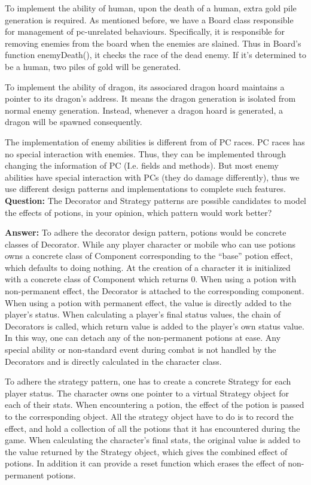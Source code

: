 \documentclass[11pt]{article}
\theoremstyle{plain} \newtheorem{theorem*}{Theorem}[subsection]
\begin{document}
To implement the ability of human, upon the death of a human, extra gold pile
generation is required. As mentioned before, we have a Board class responsible
for management of pc-unrelated behaviours. Specifically, it is responsible for
removing enemies from the board when the enemies are slained. Thus in Board’s
function enemyDeath(), it checks the race of the dead enemy. If it’s determined
to be a human, two piles of gold will be generated. 

To implement the ability of dragon, its associared dragon hoard maintains a
pointer to its dragon’s address. It means the dragon generation is isolated
from normal enemy generation. Instead, whenever a dragon hoard is generated, a
dragon will be spawned consequently.  

The implementation of enemy abilities is different from of PC races. PC races
has no special interaction with enemies. Thus, they can be implemented through
changing the information of PC (I.e. fields and methods). But most enemy
abilities have special interaction with PCs (they do damage differently), thus
we use different design patterns and implementations to complete such features. \\

\textbf{Question:}
The Decorator and Strategy patterns are possible candidates to model the
effects of potions, in your opinion, which pattern would work better? 

\textbf{Answer:}
To adhere the decorator design pattern, potions would be concrete classes of
Decorator. While any player character or mobile who can use potions owns a
concrete class of Component corresponding to the “base” potion effect, which
defaults to doing nothing. At the creation of a character it is initialized
with a concrete class of Component which returns 0. When using a potion with
non-permanent effect, the Decorator is attached to the corresponding component.
When using a potion with permanent effect, the value is directly added to the
player’s status. When calculating a player’s final status values, the chain of
Decorators is called, which return value is added to the player’s own status
value. In this way, one can detach any of the non-permanent potions at ease.
Any special ability or non-standard event during combat is not handled by the
Decorators and is directly calculated in the character class. 

To adhere the strategy pattern, one has to create a concrete Strategy for each
player status. The character owns one pointer to a virtual Strategy object for
each of their stats. When encountering a potion, the effect of the potion is
passed to the corresponding object. All the strategy object have to do is to
record the effect, and hold a collection of all the potions that it has
encountered during the game. When calculating the character’s final stats, the
original value is added to the value returned by the Strategy object, which
gives the combined effect of potions. In addition it can provide a reset
function which erases the effect of non-permanent potions.  
\end{document}

